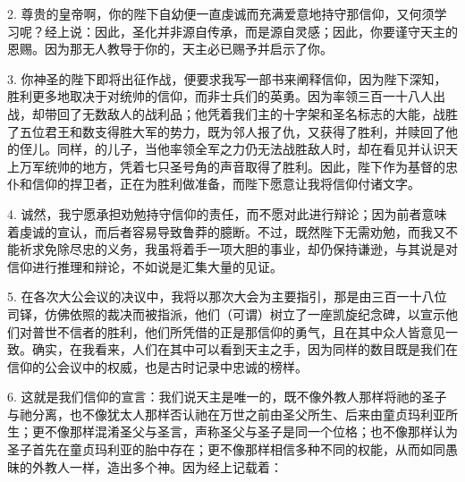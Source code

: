 2. 尊贵的皇帝啊，你的陛下自幼便一直虔诚而充满爱意地持守那信仰，又何须学习呢？经上说：因此，圣化并非源自传承，而是源自灵感；因此，你要谨守天主的恩赐。因为那无人教导于你的，天主必已赐予并启示了你。\par

3. 你神圣的陛下即将出征作战，便要求我写一部书来阐释信仰，因为陛下深知，胜利更多地取决于对统帅的信仰，而非士兵们的英勇。因为率领三百一十八人出战，却带回了无数敌人的战利品；他凭着我们主的十字架和圣名标志的大能，战胜了五位君王和数支得胜大军的势力，既为邻人报了仇，又获得了胜利，并赎回了他的侄儿。同样，的儿子，当他率领全军之力仍无法战胜敌人时，却在看见并认识天上万军统帅的地方，凭着七只圣号角的声音取得了胜利。因此，陛下作为基督的忠仆和信仰的捍卫者，正在为胜利做准备，而陛下愿意让我将信仰付诸文字。\par

4. 诚然，我宁愿承担劝勉持守信仰的责任，而不愿对此进行辩论；因为前者意味着虔诚的宣认，而后者容易导致鲁莽的臆断。不过，既然陛下无需劝勉，而我又不能祈求免除尽忠的义务，我虽将着手一项大胆的事业，却仍保持谦逊，与其说是对信仰进行推理和辩论，不如说是汇集大量的见证。\par

5. 在各次大公会议的决议中，我将以那次大会为主要指引，那是由三百一十八位司铎，仿佛依照的裁决而被指派，他们（可谓）树立了一座凯旋纪念碑，以宣示他们对普世不信者的胜利，他们所凭借的正是那信仰的勇气，且在其中众人皆意见一致。确实，在我看来，人们在其中可以看到天主之手，因为同样的数目既是我们在信仰的公会议中的权威，也是古时记录中忠诚的榜样。\par

\par

6. 这就是我们信仰的宣言：我们说天主是唯一的，既不像外教人那样将祂的圣子与祂分离，也不像犹太人那样否认祂在万世之前由圣父所生、后来由童贞玛利亚所生；更不像那样混淆圣父与圣言，声称圣父与圣子是同一个位格；也不像那样认为圣子首先在童贞玛利亚的胎中存在；更不像那样相信多种不同的权能，从而如同愚昧的外教人一样，造出多个神。因为经上记载着：\par


